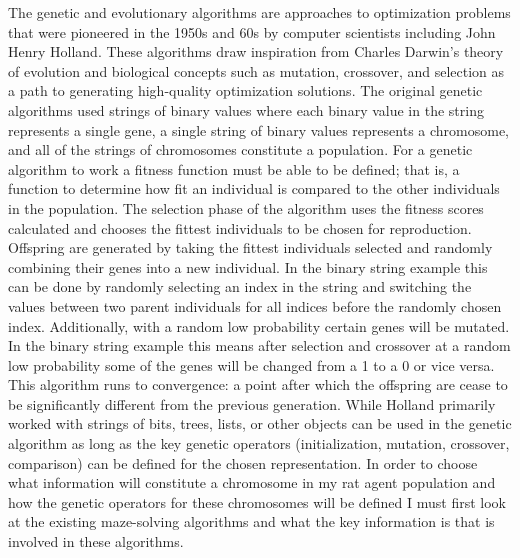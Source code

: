 \documentclass[12pt]{article}
\begin{document}
\hspace*{\parindent} The genetic and evolutionary algorithms are approaches to optimization problems that were pioneered in the 1950s and 60s by computer scientists including John Henry Holland. These algorithms draw inspiration from Charles Darwin's theory of evolution and biological concepts such as mutation, crossover, and selection as a path to generating high-quality optimization solutions. The original genetic algorithms used strings of binary values where each binary value in the string represents a single gene, a single string of binary values represents a chromosome, and all of the strings of chromosomes constitute a population. For a genetic algorithm to work a fitness function must be able to be defined; that is, a function to determine how fit an individual is compared to the other individuals in the population. The selection phase of the algorithm uses the fitness scores calculated and chooses the fittest individuals to be chosen for reproduction. Offspring are generated by taking the fittest individuals selected and randomly combining their genes into a new individual. In the binary string example this can be done by randomly selecting an index in the string and switching the values between two parent individuals for all indices before the randomly chosen index. Additionally, with a random low probability certain genes will be mutated. In the binary string example this means after selection and crossover at a random low probability some of the genes will be changed from a 1 to a 0 or vice versa. This algorithm runs to convergence: a point after which the offspring are cease to be significantly different from the previous generation. While Holland primarily worked with strings of bits, trees, lists, or other objects can be used in the genetic algorithm as long as the key genetic operators (initialization, mutation, crossover, comparison) can be defined for the chosen representation. In order to choose what information will constitute a chromosome in my rat agent population and how the genetic operators for these chromosomes will be defined I must first look at the existing maze-solving algorithms and what the key information is that is involved in these algorithms.
\end{document}
